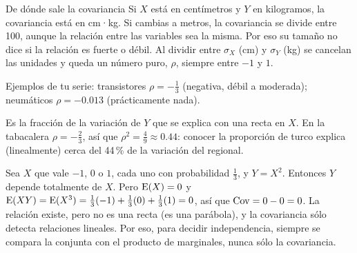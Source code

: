 \begin{afondo}{De dónde sale la covariancia}
Si $X$ está en centímetros y $Y$ en kilogramos, la covariancia está en cm·kg. Si cambias a metros, la covariancia se divide
entre 100, aunque la relación entre las variables sea la misma. Por eso su tamaño no dice si la relación es fuerte o débil.
Al dividir entre $\sigma_X$ (cm) y $\sigma_Y$ (kg) se cancelan las unidades y queda un número puro, $\rho$, siempre entre
$-1$ y $1$.

\begin{center}
\end{center}
Ejemplos de tu serie: transistores $\rho=-\tfrac13$ (negativa, débil a moderada); neumáticos $\rho=-0.013$ (prácticamente nada).

Es la fracción de la variación de $Y$ que se explica con una recta en $X$. En la tabacalera $\rho=-\tfrac23$, así que
$\rho^2=\tfrac49\approx0.44$: conocer la proporción de turco explica (linealmente) cerca del 44\,\% de la variación del regional.

Sea $X$ que vale $-1$, $0$ o $1$, cada uno con probabilidad $\tfrac13$, y $Y=X^2$. Entonces $Y$ depende totalmente de $X$.
Pero $\operatorname{E}(X)=0$ y $\operatorname{E}(XY)=\operatorname{E}(X^3)=\tfrac13(-1)+\tfrac13(0)+\tfrac13(1)=0$, así que $\operatorname{Cov}=0-0=0$. La relación existe, pero no
es una recta (es una parábola), y la covariancia sólo detecta relaciones lineales. Por eso, para decidir independencia,
siempre se compara la conjunta con el producto de marginales, nunca sólo la covariancia.
\end{afondo}
